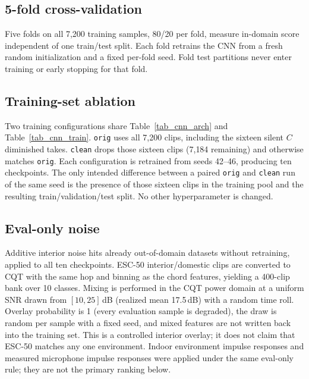 \documentclass[pdflatex,sn-mathphys-num,iicol]{sn-jnl}
\begin{document}
\subsection{5-fold cross-validation}\label{subsec_kfold}

Five folds on all 7{,}200 training samples, 80/20 per fold, measure in-domain score independent of one train/test split. Each fold retrains the CNN from a fresh random initialization and a fixed per-fold seed. Fold test partitions never enter training or early stopping for that fold.

\subsection{Training-set ablation}\label{subsec_ablation}

Two training configurations share Table~\ref{tab_cnn_arch} and Table~\ref{tab_cnn_train}. \texttt{orig} uses all 7{,}200 clips, including the sixteen silent $C$ diminished takes. \texttt{clean} drops those sixteen clips (7{,}184 remaining) and otherwise matches \texttt{orig}. Each configuration is retrained from seeds 42--46, producing ten checkpoints. The only intended difference between a paired \texttt{orig} and \texttt{clean} run of the same seed is the presence of those sixteen clips in the training pool and the resulting train/validation/test split. No other hyperparameter is changed.

\subsection{Eval-only noise}\label{subsec_noise}

Additive interior noise hits already out-of-domain datasets without retraining, applied to all ten checkpoints. ESC-50 interior/domestic clips \cite{Piczak2015} are converted to CQT with the same hop and binning as the chord features, yielding a 400-clip bank over 10 classes. Mixing is performed in the CQT power domain at a uniform SNR drawn from $[10, 25]$\,dB (realized mean 17.5\,dB) with a random time roll. Overlay probability is 1 (every evaluation sample is degraded), the draw is random per sample with a fixed seed, and mixed features are not written back into the training set. This is a controlled interior overlay; it does not claim that ESC-50 matches any one environment. Indoor environment impulse responses and measured microphone impulse responses were applied under the same eval-only rule; they are not the primary ranking below.
\end{document}
